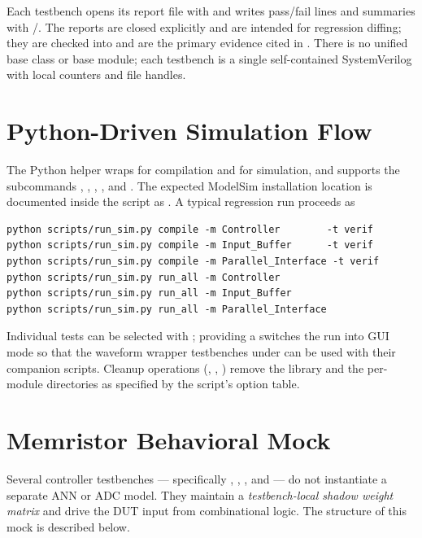 Each testbench opens its report file with  and writes
pass/fail lines and summaries with /. The
reports are closed explicitly and are intended for regression diffing;
they are checked into  and are the primary evidence cited in
. There is no unified base class or base module; each
testbench is a single self-contained SystemVerilog  with local
counters and file handles.

\section{Python-Driven Simulation Flow}
\label{sec:verif-runscript}

The Python helper  wraps  for compilation
and  for simulation, and supports the subcommands ,
, , , and . The expected
ModelSim installation location is documented inside the script as
. A typical
regression run proceeds as

\begin{lstlisting}[style=plainstyle,language={}]
python scripts/run_sim.py compile -m Controller        -t verif
python scripts/run_sim.py compile -m Input_Buffer      -t verif
python scripts/run_sim.py compile -m Parallel_Interface -t verif
python scripts/run_sim.py run_all -m Controller
python scripts/run_sim.py run_all -m Input_Buffer
python scripts/run_sim.py run_all -m Parallel_Interface
\end{lstlisting}

Individual tests can be selected with ; providing a
 switches the run into GUI mode so that the waveform
wrapper testbenches under  can be used with
their companion  scripts. Cleanup operations (,
, ) remove the  library and the
per-module  directories as specified by the script's option
table.

\section{Memristor Behavioral Mock}
\label{sec:verif-mock}

Several controller testbenches --- specifically
,
,
, and
 --- do not instantiate a
separate ANN or ADC model. They maintain a \emph{testbench-local shadow
weight matrix} and drive the DUT input 
from combinational logic. The structure of this mock is described below.

